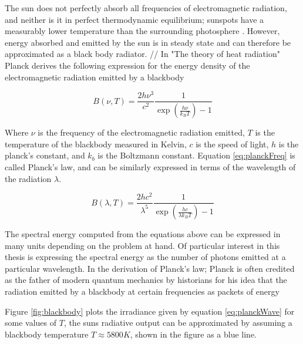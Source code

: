 The sun does not perfectly absorb all frequencies of electromagnetic radiation, and neither is it in perfect thermodynamic equilibrium; sunspots have a measurably lower temperature than the surrounding photosphere . However, energy absorbed and emitted by the sun is in steady state and can therefore be approximated as a black body radiator. 
//
In "The theory of heat radiation" Planck derives the following expression for the energy density of the electromagnetic radiation emitted by a blackbody  

\begin{equation}\label{eq:planckFreq}
    B(\nu, T) = \frac{2 h \nu^3}{c^2} \frac{1}{\exp(\frac{h \nu}{k_B T}) - 1}
\end{equation}

Where $\nu$ is the frequency of the electromagnetic radiation emitted, $T$ is the temperature of the blackbody measured in Kelvin, $c$ is the speed of light, $h$ is the planck's constant, and $k_b$ is the Boltzmann constant. Equation \ref{eq:planckFreq} is called Planck's law, and can be similarly expressed in terms of the wavelength of the radiation $\lambda$.

\begin{equation}\label{eq:planckWave}
    B(\lambda, T) = \frac{2 h c^2}{\lambda^5} \frac{1}{\exp(\frac{hc}{\lambda k_B T}) - 1}
\end{equation}

The spectral energy computed from the equations above can be expressed in many units depending on the problem at hand. Of particular interest in this thesis is expressing the spectral energy as the number of photons emitted at a particular wavelength. In the derivation of Planck's law; Planck is often credited as the father of modern quantum mechanics by historians for his idea that the radiation emitted by a blackbody at certain frequencies as packets of energy 

Figure \ref{fig:blackbody} plots the irradiance given by equation \ref{eq:planckWave} for some values of $T$, the suns radiative output can be approximated by assuming a blackbody temperature $T \approx 5800 K$, shown in the figure as a blue line.

\newpage

